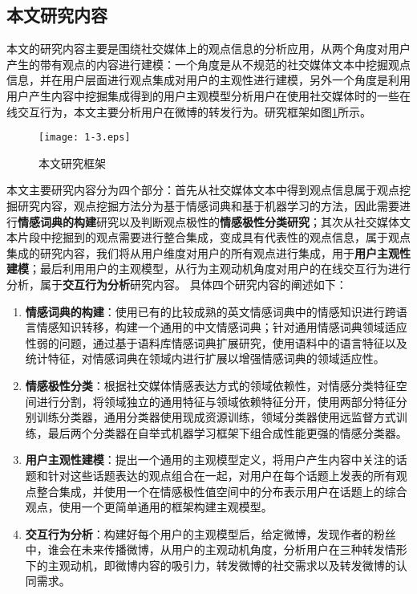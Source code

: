 \subsection{本文研究内容}
本文的研究内容主要是围绕社交媒体上的观点信息的分析应用，从两个角度对用户产生的带有观点的内容进行建模：一个角度是从不规范的社交媒体文本中挖掘观点信息，并在用户层面进行观点集成对用户的主观性进行建模，另外一个角度是利用用户产生内容中挖掘集成得到的用户主观模型分析用户在使用社交媒体时的一些在线交互行为，本文主要分析用户在微博的转发行为。研究框架如图\ref{fig1-3}所示。

\begin{figure}[htp]
\centering
\texttt{[image: 1-3.eps]}
\caption{本文研究框架}
\label{fig1-3}
\end{figure}

本文主要研究内容分为四个部分：首先从社交媒体文本中得到观点信息属于观点挖掘研究内容，观点挖掘方法分为基于情感词典和基于机器学习的方法，因此需要进行\textbf{情感词典的构建}研究以及判断观点极性的\textbf{情感极性分类研究}；其次从社交媒体文本片段中挖掘到的观点需要进行整合集成，变成具有代表性的观点信息，属于观点集成的研究内容，我们将从用户维度对用户的所有观点进行集成，用于\textbf{用户主观性建模}；最后利用用户的主观模型，从行为主观动机角度对用户的在线交互行为进行分析，属于\textbf{交互行为分析}研究内容。
具体四个研究内容的阐述如下：

\begin{enumerate}
\item \textbf{情感词典的构建}：使用已有的比较成熟的英文情感词典中的情感知识进行跨语言情感知识转移，构建一个通用的中文情感词典；针对通用情感词典领域适应性弱的问题，通过基于语料库情感词典扩展研究，使用语料中的语言特征以及统计特征，对情感词典在领域内进行扩展以增强情感词典的领域适应性。
\item \textbf{情感极性分类}：根据社交媒体情感表达方式的领域依赖性，对情感分类特征空间进行分割，将领域独立的通用特征与领域依赖特征分开，使用两部分特征分别训练分类器，通用分类器使用现成资源训练，领域分类器使用远监督方式训练，最后两个分类器在自举式机器学习框架下组合成性能更强的情感分类器。
\item \textbf{用户主观性建模}：提出一个通用的主观模型定义，将用户产生内容中关注的话题和针对这些话题表达的观点组合在一起，对用户在每个话题上发表的所有观点整合集成，并使用一个在情感极性值空间中的分布表示用户在话题上的综合观点，使用一个更简单通用的框架构建主观模型。
\item \textbf{交互行为分析}：构建好每个用户的主观模型后，给定微博，发现作者的粉丝中，谁会在未来传播微博，从用户的主观动机角度，分析用户在三种转发情形下的主观动机，即微博内容的吸引力，转发微博的社交需求以及转发微博的认同需求。
\end{enumerate}

